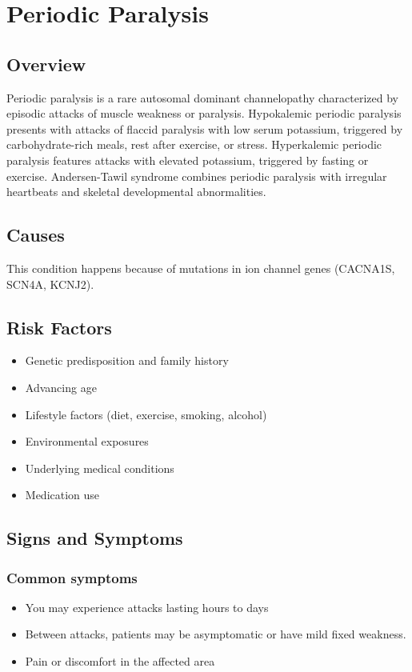 \chapter{Periodic Paralysis}
\label{sec:Periodic Paralysis}

\section{Overview}
Periodic paralysis is a rare autosomal dominant channelopathy characterized by episodic attacks of muscle weakness or paralysis. Hypokalemic periodic paralysis presents with attacks of flaccid paralysis with low serum potassium, triggered by carbohydrate-rich meals, rest after exercise, or stress. Hyperkalemic periodic paralysis features attacks with elevated potassium, triggered by fasting or exercise. Andersen-Tawil syndrome combines periodic paralysis with irregular heartbeats and skeletal developmental abnormalities.
\section{Causes}
This condition happens because of mutations in ion channel genes (CACNA1S, SCN4A, KCNJ2).     
\section{Risk Factors}

\begin{itemize}[noitemsep]
  \item Genetic predisposition and family history
  \item Advancing age
  \item Lifestyle factors (diet, exercise, smoking, alcohol)
  \item Environmental exposures
  \item Underlying medical conditions
  \item Medication use
\end{itemize}
\section{Signs and Symptoms}

\subsection{Common symptoms}
\begin{itemize}[noitemsep]
  \item You may experience attacks lasting hours to days
  \item Between attacks, patients may be asymptomatic or have mild fixed weakness.
  \item Pain or discomfort in the affected area
  \end{itemize}

